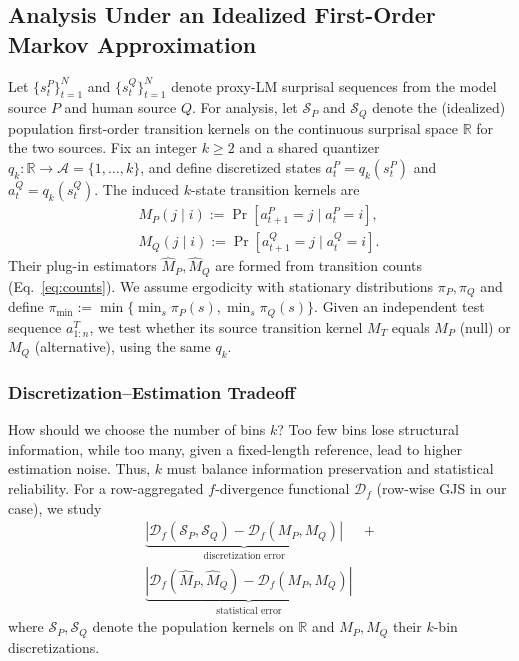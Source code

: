 \documentclass{article}
\theoremstyle{plain}
\theoremstyle{definition}
\theoremstyle{remark}
\begin{document}
\subsection{Analysis Under an Idealized First-Order Markov Approximation}\label{sec:setup}

Let $\{s_t^P\}_{t=1}^N$ and $\{s_t^Q\}_{t=1}^N$ denote proxy-LM surprisal sequences from the model source $P$ and human source $Q$. For analysis, let $\mathcal{S}_P$ and $\mathcal{S}_Q$ denote the (idealized) population first-order transition kernels on the continuous surprisal space $\mathbb{R}$ for the two sources.
Fix an integer $k\ge2$ and a shared quantizer $q_k:\mathbb{R}\to\mathcal{A}=\{1,\dots,k\}$, and define discretized states $a_t^P=q_k(s_t^P)$ and $a_t^Q=q_k(s_t^Q)$. 
The induced $k$-state transition kernels are
\begin{align}
&M_P(j\mid i):=\Pr[a_{t+1}^P=j\mid a_t^P=i],\quad \nonumber\\
& M_Q(j\mid i):=\Pr[a_{t+1}^Q=j\mid a_t^Q=i]. \nonumber
\end{align}
Their plug-in estimators $\hat M_P,\hat M_Q$ are formed from transition counts (Eq.~\ref{eq:counts}). 
We assume ergodicity with stationary distributions $\pi_P,\pi_Q$ and define $\pi_{\min}:=\min\{\min_{s}\pi_P(s),\min_{s}\pi_Q(s)\}$. 
Given an independent test sequence $a^T_{1:n}$, we test whether its source transition kernel $M_T$ equals $M_P$ (null) or $M_Q$ (alternative), using the same $q_k$.

\subsubsection{Discretization--Estimation Tradeoff}\label{sec:quant-effect}
How should we choose the number of bins $k$? Too few bins lose structural information, while too many, given a fixed-length reference, lead to  higher estimation noise. Thus, $k$ must balance information preservation and statistical reliability.
For a row-aggregated $f$-divergence functional $\mathcal{D}_f$ (row-wise GJS in our case), we study
\begin{align}
\underbrace{|\mathcal{D}_f(\mathcal{S}_P,\mathcal{S}_Q)-\mathcal{D}_f(M_P,M_Q)|}_{\text{discretization error}}& + \nonumber\\ \underbrace{|\mathcal{D}_f(\hat M_P, \hat M_Q)-\mathcal{D}_f(M_P,M_Q)|}_{\text{statistical error}} \nonumber
\end{align}
where $\mathcal{S}_P,\mathcal{S}_Q$ denote the population kernels on $\mathbb{R}$ and $M_P,M_Q$ their $k$-bin discretizations.
\end{document}
